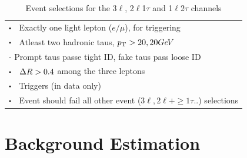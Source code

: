 \documentclass[letterpaper,12pt]{article}
\newcommand\sbullet[1][.5]{\mathbin{\vcenter{\hbox{\scalebox{#1}{$\bullet$}}}}}  %
\newcommand{\GeV}{{Ge\kern -0.1em V}}
\begin{document}
\begin{table}
{\begin{tabular}{l}
    \hline
    $\sbullet \hspace{0.2cm}$ Exactly one light lepton ($e/\mu$), for triggering\\
    $\sbullet \hspace{0.2cm}$ Atleast two hadronic taus, $\pt>20,20 \GeV$\\
    \hspace{1cm}- Prompt taus passe tight ID, fake taus pass loose ID\\
    $\sbullet \hspace{0.2cm}$ $\Delta R>0.4$ among the three leptons\\
    $\sbullet \hspace{0.2cm}$ Triggers (in data only)\\
    $\sbullet \hspace{0.2cm}$ Event should fail all other event ($3\ell,2\ell+\geq1\tau..$) selections\\
    \hline \hline
    \end{tabular}%
  }
  \caption{Event selections for the 3$\ell$, 2$\ell$1$\tau$ and 1$\ell$2$\tau$ channels}
  \label{tab:eventsel}
\end{table}

\section{Background Estimation}
\label{sec:bkgs}
\end{document}
